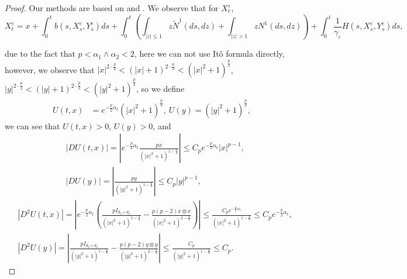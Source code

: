 \documentclass[11pt,reqno]{amsart}
\numberwithin{equation}{section}
\begin{document}
\begin{proof}
	Our methods are based on \cite{LRSX} and \cite{SXX}.	We observe that for $X_{t}^{\varepsilon} $,
	\begin{equation*}
			X_{t}^{\varepsilon}=x+\int_{0}^{t}b(s,X_{s}^{\varepsilon},Y_{s}^{\varepsilon})ds+\int_{0}^{t}\left( \int_{|z|\leq 1}z \tilde{N}^{1}(ds,dz)+\int_{|z|> 1}zN^{1}(ds,dz)\right)+\int_{0}^{t}\frac{1}{\gamma_{\varepsilon}}H(s,X_{s}^{\varepsilon},Y_{s}^{\varepsilon})ds,
	\end{equation*}

due to the fact that $p<\alpha_{1}\wedge\alpha_{2}<2$, here we can not use It\^{o} formula directly, however,  we observe that $ |x|^{2\cdot \frac{p}{2}}<(|x|+1)^{2\cdot \frac{p}{2}}<(|x|^{2}+1)^{\frac{p}{2}}$,  $ |y|^{2\cdot \frac{p}{2}}<(|y|+1)^{2\cdot \frac{p}{2}}<(|y|^{2}+1)^{\frac{p}{2}}$, so we define 
	\begin{equation}
		\begin{split}
			U(t,x)&=e^{-\frac{p}{2}\alpha_{t}}(|x|^{2}+1)^{\frac{p}{2}},\	U(y)=(|y|^{2}+1)^{\frac{p}{2}},
		\end{split}\nonumber
	\end{equation}
	we can see that  $U(t,x)>0$, $U(y)>0$, and 
	\begin{equation}\label{du}
		\begin{split}
			&|DU(t,x)|=\left| e^{-\frac{p}{2}\alpha_{t}} \frac{px}{(|x|^{2}+1)^{1-\frac{p}{2}}}\right|\leq C_{p} e^{-\frac{p}{2}\alpha_{t}}|x|^{p-1},\\
			& |DU(y)|=\left|  \frac{py}{(|y|^{2}+1)^{1-\frac{p}{2}}}\right|\leq C_{p} |y|^{p-1},
				\end{split}
		\end{equation}
	\begin{equation}\label{d2u}
	\begin{split}
			&|D^{2}U(t,x)|=\left| e^{-\frac{p}{2}\alpha_{t}}\left(  \frac{pI_{d_{2}\times d_{2} }}{(|x|^{2}+1)^{1-\frac{p}{2}}}-\frac{p(p-2)x\otimes x}{(|x|^{2}+1)^{2-\frac{p}{2}}}\right) \right|\leq \frac{C_{p}e^{-\frac{p}{2}\alpha_{t}}}{(|x|^{2}+1)^{1-\frac{p}{2}}}\leq C_{p}e^{-\frac{p}{2}\alpha_{t}},\\
			&|D^{2}U(y)|=\left|   \frac{pI_{d_{2}\times d_{2} }}{(|y|^{2}+1)^{1-\frac{p}{2}}}-\frac{p(p-2)y\otimes y}{(|y|^{2}+1)^{2-\frac{p}{2}}} \right|\leq \frac{C_{p}}{(|y|^{2}+1)^{1-\frac{p}{2}}}\leq C_{p}.
		\end{split}
	\end{equation}
	

\end{proof}
\end{document}
